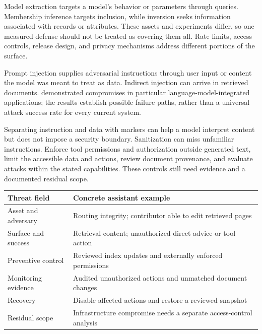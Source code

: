 Model extraction targets a model's behavior or parameters through queries. Membership inference targets inclusion, while inversion seeks information associated with records or attributes. These assets and experiments differ, so one measured defense should not be treated as covering them all. Rate limits, access controls, release design, and privacy mechanisms address different portions of the surface.

Prompt injection supplies adversarial instructions through user input or content the model was meant to treat as data. Indirect injection can arrive in retrieved documents. \citet{greshake2023indirect} demonstrated compromises in particular language-model-integrated applications; the results establish possible failure paths, rather than a universal attack success rate for every current system.

Separating instruction and data with markers can help a model interpret content but does not impose a security boundary. Sanitization can miss unfamiliar instructions. Enforce tool permissions and authorization outside generated text, limit the accessible data and actions, review document provenance, and evaluate attacks within the stated capabilities. These controls still need evidence and a documented residual scope.

\par\addvspace{\intextsep}\noindent\begin{minipage}{\linewidth}
\centering\small
\begin{tabular}{@{}L{2.1cm}L{7.6cm}@{}}
\toprule
Threat field & Concrete assistant example \\
\midrule
Asset and adversary & Routing integrity; contributor able to edit retrieved pages \\
Surface and success & Retrieval content; unauthorized direct advice or tool action \\
Preventive control & Reviewed index updates and externally enforced permissions \\
Monitoring evidence & Audited unauthorized actions and unmatched document changes \\
Recovery & Disable affected actions and restore a reviewed snapshot \\
Residual scope & Infrastructure compromise needs a separate access-control analysis \\
\bottomrule
\end{tabular}
\label{tab:security-threat-card}
\end{minipage}\par\addvspace{\intextsep}

